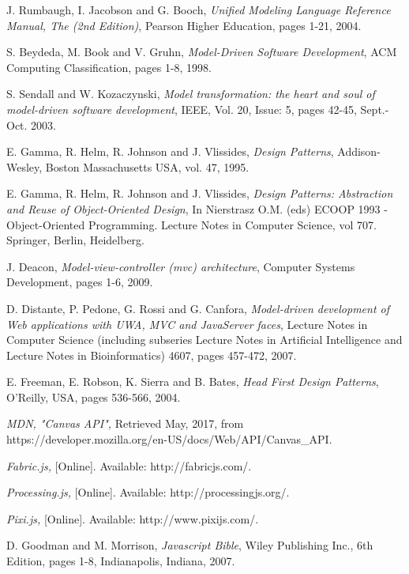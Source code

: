 \begin{thebibliography}{1}
	 J. Rumbaugh, I. Jacobson and G. Booch, {\em Unified Modeling Language Reference Manual, The (2nd Edition)}, Pearson Higher Education, pages 1-21, 2004.
	
	 S. Beydeda, M. Book and V. Gruhn, {\em Model-Driven Software Development}, ACM Computing Classification, pages 1-8, 1998.
	
	 S. Sendall and W. Kozaczynski, {\em Model transformation: the heart and soul of model-driven software development},  IEEE, Vol. 20, Issue: 5, pages 42-45, Sept.-Oct. 2003.
	
	 E. Gamma, R. Helm, R. Johnson and J. Vlissides, {\em Design Patterns},  Addison-Wesley, Boston Massachusetts USA, vol. 47, 1995.
	
	 E. Gamma, R. Helm, R. Johnson and J. Vlissides, {\em Design Patterns: Abstraction and Reuse of Object-Oriented Design}, In Nierstrasz O.M. (eds) ECOOP 1993 - Object-Oriented Programming. Lecture Notes in Computer Science, vol 707. Springer, Berlin, Heidelberg.
	
	 J. Deacon, { \em Model-view-controller (mvc) architecture}, Computer Systems Development, pages 1-6, 2009.
	
	 D. Distante, P. Pedone, G. Rossi and G. Canfora, { \em Model-driven development of Web applications with UWA, MVC and JavaServer faces}, Lecture Notes in Computer Science (including subseries Lecture Notes in Artificial Intelligence and Lecture Notes in Bioinformatics) 4607, pages 457-472, 2007.
	
	 E. Freeman, E. Robson, K. Sierra and B. Bates, { \em Head First Design Patterns}, O'Reilly, USA, pages 536-566, 2004.
	
	 {\em MDN, "Canvas API",} Retrieved May, 2017, from https://developer.mozilla.org/en-US/docs/Web/API/Canvas\_API.
	
	 {\em Fabric.js,} [Online]. Available: http://fabricjs.com/.
	
	 {\em Processing.js,} [Online]. Available: http://processingjs.org/.
	
	 {\em Pixi.js,} [Online]. Available: http://www.pixijs.com/.
	
	 D. Goodman and M. Morrison, {\em Javascript Bible}, Wiley Publishing Inc., 6th Edition, pages 1-8, Indianapolis, Indiana, 2007.
	

\end{thebibliography}

